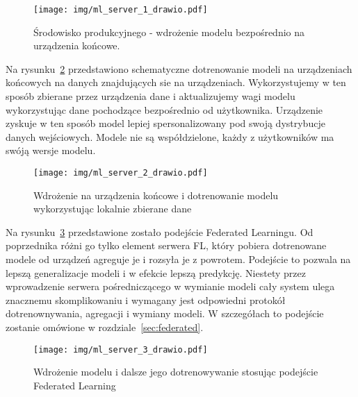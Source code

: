 \begin{figure}[h!]
    \centering
    \texttt{[image: img/ml\_server\_1\_drawio.pdf]}
    \caption{Środowisko produkcyjnego - wdrożenie modelu bezpośrednio na urządzenia końcowe.}
    \label{fig:deploy-1}
    \vspace{-4mm}
\end{figure}

Na rysunku~\ref{fig:deploy-2} przedstawiono schematyczne dotrenowanie modeli na urządzeniach
końcowych na danych znajdujących sie na urządzeniach. Wykorzystujemy w ten sposób zbierane przez
urządzenia dane i aktualizujemy wagi modelu wykorzystując dane pochodzące bezpośrednio od
użytkownika. Urządzenie zyskuje w ten sposób model
lepiej spersonalizowany pod swoją dystrybucje danych wejściowych. Modele nie są współdzielone,
każdy z użytkowników ma swóją wersje modelu.

\begin{figure}[h!]
    \centering
    \texttt{[image: img/ml\_server\_2\_drawio.pdf]}
    \caption{Wdrożenie na urządzenia końcowe i dotrenowanie modelu wykorzystując lokalnie zbierane dane}
    \label{fig:deploy-2}
    \vspace{-4mm}
\end{figure}

Na rysunku~\ref{fig:deploy-3} przedstawione zostało podejście Federated Learningu. Od poprzednika
różni go tylko element serwera FL, który pobiera dotrenowane modele od urządzeń agreguje je i
rozsyła je z powrotem. Podejście to pozwala na lepszą generalizacje modeli i w efekcie lepszą
predykcję. Niestety przez wprowadzenie serwera pośredniczącego w wymianie modeli cały system
ulega znacznemu skomplikowaniu i wymagany jest odpowiedni protokół dotrenownywania, agregacji i
wymiany modeli. W szczegółach to podejście zostanie omówione w rozdziale~\ref{sec:federated}.

\begin{figure}[h!]
    \centering
    \texttt{[image: img/ml\_server\_3\_drawio.pdf]}
    \caption{Wdrożenie modelu i dalsze jego dotrenowywanie stosując podejście Federated Learning}
    \label{fig:deploy-3}
    \vspace{-4mm}
\end{figure}
